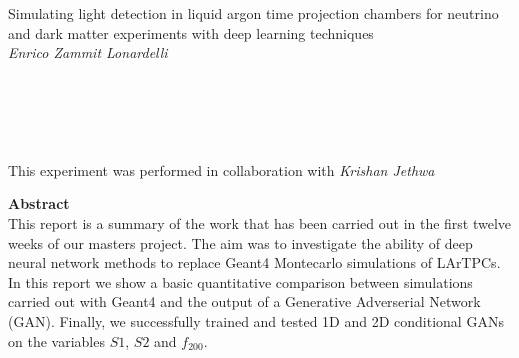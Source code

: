 \documentclass[11pt]{article} %
\begin{document}



\begin{center} %

{\Huge Simulating light detection in liquid argon time projection chambers for neutrino and dark matter experiments with deep learning techniques}\\[0.5cm] %
\vspace{5mm}
\textit{Enrico Zammit Lonardelli}
\\
\vspace{5mm}
\\
\vspace{5mm}
\\
\vspace{5mm}
\\
\vspace{5mm}
\\
\vspace{5mm}
\\
\vspace{5mm}
This experiment was performed in collaboration with \textit{Krishan Jethwa}\\[0.3cm] %


\end{center}
\vspace{60mm}
{\Large \textbf{Abstract}}
\vspace{2mm}
\\
This report is a summary of the work that has been carried out in the first twelve weeks of our masters project. The aim was to investigate the ability of deep neural network methods to replace Geant4 Montecarlo simulations of LArTPCs. In this report we show a basic quantitative comparison between simulations carried out with Geant4 and the output of a Generative Adverserial Network (GAN). Finally, we successfully trained and tested 1D and 2D conditional GANs on the variables $S1$, $S2$ and $f_{200}$.
\end{document}
